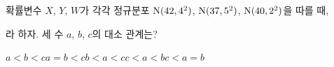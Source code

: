 확률변수 $X$, $Y$, $W$가 각각 정규분포 $\mathrm{N}(42{,}\mkern3mu\mathopen{}4^2)$, $\mathrm{N}(37{,}\mkern3mu\mathopen{}5^2)$, $\mathrm{N}(40{,}\mkern3mu\mathopen{}2^2)$을 따를 때, \par\smallskip{}\par\smallskip\noindent 라 하자. 세 수 $a$, $b$, $c$의 대소 관계는?
\begin{choices32}{$a<b<c$}{$a=b<c$}{$b<a<c$}{$c<a<b$}{$c<a=b$}\end{choices32}
